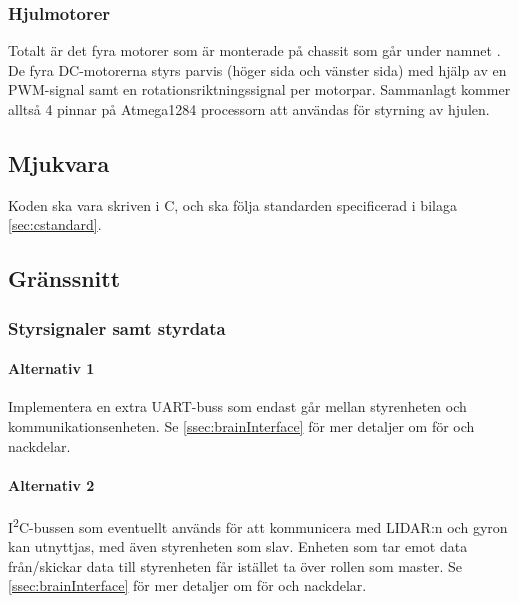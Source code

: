 \documentclass[a4paper,11pt]{article}
\begin{document}


\subsubsection{Hjulmotorer}
Totalt är det fyra motorer som är monterade på chassit som går under namnet \cite{terminator}. De fyra DC-motorerna styrs parvis (höger sida och vänster sida) med hjälp av en PWM-signal samt en rotationsriktningssignal per motorpar. Sammanlagt kommer alltså 4 pinnar på Atmega1284 processorn att användas för styrning av hjulen.

\subsection{Mjukvara}

Koden ska vara skriven i C, och ska följa standarden specificerad i bilaga \ref{sec:cstandard}.

\subsection{Gränssnitt} \label{ssec:controllInterface}

\subsubsection{Styrsignaler samt styrdata}

\paragraph{Alternativ 1}
Implementera en extra UART-buss som endast går mellan styrenheten och kommunikationsenheten. Se \ref{ssec:brainInterface} för mer detaljer om för och nackdelar.

\paragraph{Alternativ 2}
I\textsuperscript{2}C-bussen som eventuellt används för att kommunicera med LIDAR:n och gyron kan utnyttjas, med även styrenheten som slav. Enheten som tar emot data från/skickar data till styrenheten får istället ta över rollen som master. Se \ref{ssec:brainInterface} för mer detaljer om för och nackdelar.

\newpage
\end{document}
